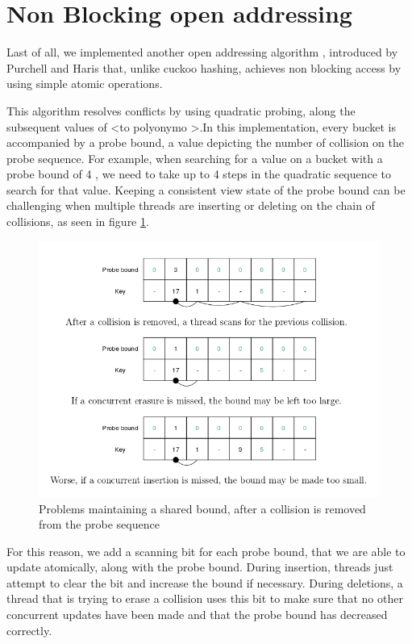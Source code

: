 \section{Non Blocking  open addressing}

Last of all, we implemented another open addressing algorithm , introduced by Purchell and Haris \cite{non_blocking_open_addressing} that, unlike cuckoo hashing,  achieves non blocking access by using simple atomic operations.

This algorithm resolves conflicts by using quadratic probing, along the subsequent values of <to polyonymo >.In this implementation, every bucket is accompanied by a probe bound, a value depicting the number of collision on the probe sequence. For example, when searching for a value on a bucket with a probe bound of 4 , we need to take up to 4 steps in the quadratic sequence to search for that value. Keeping a consistent view state of the probe bound can be challenging when multiple threads are inserting or deleting on the chain of collisions, as seen in figure \ref{non_blocking_1}.

\begin{figure}
 \centering
  \includegraphics[scale=0.5]{non_blocking_1.png}
\caption{Problems maintaining a shared bound, after a collision is removed from the probe sequence}
\label{non_blocking_1}
\end{figure}

For this reason, we add a scanning bit for each probe bound, that we are able to update atomically, along with the probe bound. During insertion, threads just attempt to clear the bit and increase the bound if necessary. During deletions, a thread that is trying to erase a collision uses this bit to make sure that no other concurrent  updates have been made and that the probe bound has decreased correctly.

